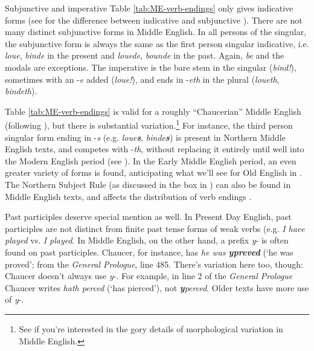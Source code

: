 \begin{miscbox}{Subjunctive and imperative}
Table \ref{tab:ME-verb-endings} only gives indicative forms (see  for the difference between indicative and subjunctive ). There are not many distinct subjunctive forms in Middle English. In all persons of the singular, the subjunctive form is always the same as the first person singular indicative, i.e. \emph{loue}, \emph{binde} in the present and \emph{louede}, \emph{bounde} in the past. Again, \emph{be} and the modals are exceptions. The imperative is the bare stem in the singular (\emph{bind!}), sometimes with an -\emph{e} added (\emph{loue!}), and ends in -\emph{eth} in the plural (\emph{loueth}, \emph{bindeth}).
\end{miscbox}


\noindent Table \ref{tab:ME-verb-endings} is valid for a roughly ``Chaucerian'' Middle English (following \citealp[115--116]{HorobinSmith2002}), but there is substantial variation.\footnote{See \citet{Mosse1952} if you're interested in the gory details of morphological variation in Middle English.} For instance, the third person singular form ending in -\emph{s} (e.g. \emph{loue\textbf{s}}, \emph{binde\textbf{s}}) is present in Northern Middle English texts, and competes with -\emph{th}, without replacing it entirely until well into the Modern English period (see ). In the Early Middle English period, an even greater variety of forms is found, anticipating what we'll see for Old English in . The Northern Subject Rule (as discussed in the box in ) can also be found in Middle English texts, and affects the distribution of verb endings \citep{DeHaasVanKemenade2014}. 

Past participles deserve special mention as well. In Present Day English, past participles are not distinct from finite past tense forms of weak verbs (e.g. \emph{I have played} vs. \emph{I played}. In Middle English, on the other hand, a prefix \emph{y}- is often found on past participles. Chaucer, for instance, has \emph{he was \textbf{ypreved}} (`he was proved'; from the \emph{General Prologue}, line 485. There's variation here too, though: Chaucer doesn't always use \emph{y}-. For example, in line 2 of the \emph{General Prologue} Chaucer writes \emph{hath perced} (`has pierced'), not \emph{\textbf{y}perced}. Older texts have more use of \emph{y}-.

